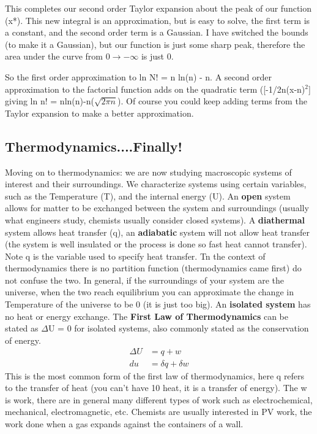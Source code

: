 \documentclass{article}
\begin{document}
This completes our second order Taylor expansion about the peak of our function (x*). 
This new integral is an approximation, but is easy to solve, the first term is a constant, and the second order term is a Gaussian. 
I have switched the bounds (to make it a Gaussian), but our function is just some sharp peak, therefore the area under the curve from 0$\rightarrow -\infty$ is just 0. 

So the first order approximation to ln N! =  n ln(n) - n.
A second order approximation to the factorial function adds on the quadratic term ([-1/2n(x-n)$^2$] giving ln n! = nln(n)-n($\sqrt{2\pi n}$).
Of course you could keep adding terms from the Taylor expansion to make a better approximation. 

\subsection*{Thermodynamics....Finally!}
Moving on to thermodynamics: we are now studying macroscopic systems of interest and their surroundings.
We characterize systems using certain variables, such as the Temperature (T), and the internal energy (U). 
An \textbf{open} system allows for matter to be exchanged between the system and surroundings (usually what engineers study, chemists usually consider closed systems). 
A \textbf{diathermal} system allows heat transfer (q), an \textbf{adiabatic} system will not allow heat transfer (the system is well insulated or the process is done so fast heat cannot transfer).
Note q is the variable used to specify heat transfer.
Tn the context of thermodynamics there is no partition function (thermodynamics came first) do not confuse the two. 
In general, if the surroundings of your system are the universe, when the two reach equilibrium you can approximate the change in Temperature of the universe to be 0 (it is just too big). 
An \textbf{isolated system} has no heat or energy exchange. 
The \textbf{First Law of Thermodynamics} can be stated as $\Delta$U = 0 for isolated systems, also commonly stated as the conservation of energy. 
\begin{equation}
\begin{split}
    \Delta U &= q+w\\
    du &= \delta q+\delta w
\end{split}
\end{equation}
This is the most common form of the first law of thermodynamics, here q refers to the transfer of heat (you can't have 10 heat, it is a transfer of energy). 
The w is work, there are in general many different types of work such as electrochemical, mechanical, electromagnetic, etc.
Chemists are usually interested in PV work, the work done when a gas expands against the containers of a wall. 
\end{document}
